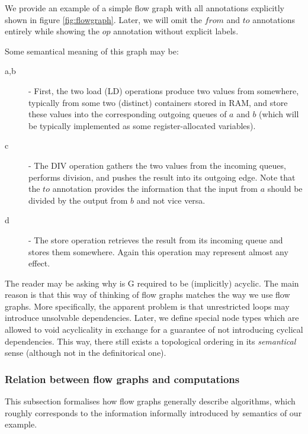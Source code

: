    We provide an example of a simple flow graph with all annotations explicitly shown in figure \ref{fig:flowgraph}. Later, we will omit the $from$ and $to$ annotations entirely while showing the $op$ annotation without explicit labels. 

Some semantical meaning of this graph may be:

  \begin{description}
  \item[a,b] - First, the two load (LD) operations produce two values from somewhere, typically from some two (distinct) containers stored in RAM, and store these values into the corresponding outgoing queues of $a$ and $b$ (which will be typically implemented as some register-allocated variables). 
  \item[c] - The DIV operation gathers the two values from the incoming queues, performs division, and pushes the result into its outgoing edge. Note that the $to$ annotation provides the information that the input from $a$ should be divided by the output from $b$ and not vice versa.
  \item[d] - The store operation retrieves the result from its incoming queue and stores them somewhere. Again this operation may represent almost any effect.
  \end{description}

\begin{rem}
  The reader may be asking why is G required to be (implicitly) acyclic. The main reason is that this way of thinking of flow graphs matches the way we use flow graphs. More specifically, the apparent problem is that unrestricted loops may introduce unsolvable dependencies. Later, we define special node types which are allowed to void acyclicality in exchange for a guarantee of not introducing cyclical dependencies. This way, there still exists a topological ordering in its \emph{semantical} sense (although not in the definitorical one). 
\end{rem}

\subsubsection{Relation between flow graphs and computations}

  This subsection formalises how flow graphs generally describe algorithms, which roughly corresponds to the information informally introduced by semantics of our example.


